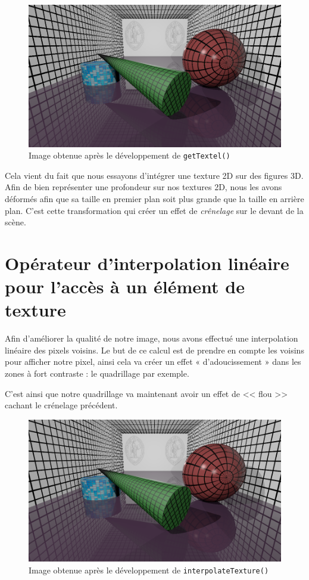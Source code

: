 \documentclass[a4paper, 11pt]{article}
\begin{document}
	\begin{figure}[H]
		\centering
		\includegraphics[width=12cm]{1-monimage.png}
		\caption{Image obtenue après le développement de \texttt{getTextel()}}
		\label{fig:fig1}
	\end{figure}
	Cela vient du fait que nous essayons d'intégrer une texture 2D sur des figures 3D. Afin de bien représenter une profondeur sur nos textures 2D, nous les
	avons déformés afin que sa taille en premier plan soit plus grande que la taille en arrière plan. C'est cette transformation qui créer un effet de
	\textit{crênelage} sur le devant de la scène.

	\section{Opérateur d'interpolation linéaire pour l'accès à un élément de texture}
	Afin d'améliorer la qualité de notre image, nous avons effectué une interpolation linéaire des pixels voisins. Le but de ce calcul est de prendre en compte
	les voisins pour afficher notre pixel, ainsi cela va créer un effet « d'adoucissement » dans les zones à fort contraste : le quadrillage par exemple.

	C'est ainsi que notre quadrillage va maintenant avoir un effet de << flou >> cachant le crénelage précédent. 
	\begin{figure}[H]
		\centering
		\includegraphics[width=12cm]{2-monimage.png}
		\caption{Image obtenue après le développement de \texttt{interpolateTexture()}}
		\label{fig:fig1}
	\end{figure}
\end{document}
